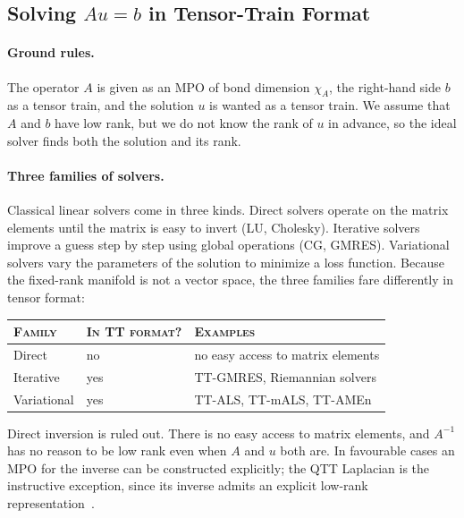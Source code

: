 \subsection{Solving \texorpdfstring{$Au = b$}{Au = b} in Tensor-Train Format}
\label{subsec:linear-solvers}

\paragraph{Ground rules.}
The operator $A$ is given as an MPO of bond dimension $\chi_A$, the right-hand
side $b$ as a tensor train, and the solution $u$ is wanted as a tensor train. We
assume that $A$ and $b$ have low rank, but we do not know the rank of $u$ in
advance, so the ideal solver finds both the solution and its rank.

\paragraph{Three families of solvers.}
Classical linear solvers come in three kinds. Direct solvers operate on the
matrix elements until the matrix is easy to invert (LU, Cholesky). Iterative
solvers improve a guess step by step using global operations (CG, GMRES).
Variational solvers vary the parameters of the solution to minimize a loss
function. Because the fixed-rank manifold is not a vector space, the three
families fare differently in tensor format:
\begin{center}
  \begin{tabular}{@{}lll@{}}
    \toprule
    \textsc{Family} & \textsc{In TT format?} & \textsc{Examples} \\
    \midrule
    Direct      & no  & no easy access to matrix elements \\
    Iterative   & yes & TT-GMRES, Riemannian solvers \\
    Variational & yes & TT-ALS, TT-mALS, TT-AMEn \\
    \bottomrule
  \end{tabular}
\end{center}

Direct inversion is ruled out. There is no easy access to matrix elements, and
$A^{-1}$ has no reason to be low rank even when $A$ and $u$ both are. In
favourable cases an MPO for the inverse can be constructed explicitly; the QTT
Laplacian is the instructive exception, since its inverse admits an explicit
low-rank representation~\cite{Kazeev2012}.

